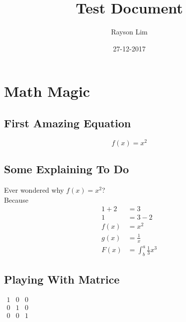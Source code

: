 \documentclass{article}
\title{Test Document}
\author{Rayson Lim}
\date{27-12-2017}
\begin{document}
    \maketitle
    \newpage
    \doublespacing
    \tableofcontents
    \singlespacing
    \newpage

    \section{Math Magic}

        \subsection{First Amazing Equation}
            \begin{equation}
            f(x) = x^2
            \end{equation}

        \subsection{Some Explaining To Do}
            Ever wondered why $f(x) = x^2$?\\
            Because
            \begin{align*}
            1 + 2 &= 3 \\
            1 &= 3 - 2 \\
            f(x) &= x^2 \\
            g(x) &= \frac{1}{x} \\
            F(x) &= \int^a_b \frac{1}{3}x^3
            \end{align*}

        \subsection{Playing With Matrice}
            $\begin{matrix}
            1 & 0 & 0 \\
            0 & 1 & 0 \\
            0 & 0 & 1
            \end{matrix}$
\end{document}
